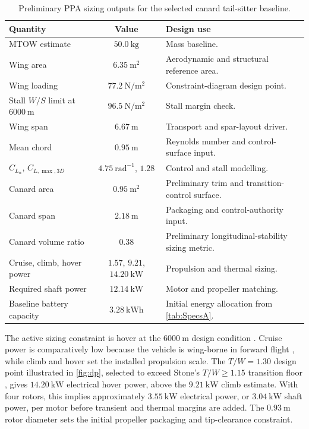 \begin{table}[H]
\centering
\scriptsize
\caption{Preliminary PPA sizing outputs for the selected canard tail-sitter baseline.}
\label{tab:ppa_preliminary_sizing_outputs}
\begin{tabularx}{0.94\textwidth}{l c X}
\toprule
\textbf{Quantity} & \textbf{Value} & \textbf{Design use} \\
\midrule
MTOW estimate          & \(50.0~\mathrm{kg}\)          & Mass baseline. \\
Wing area              & \(6.35~\mathrm{m^2}\)          & Aerodynamic and structural reference area. \\
Wing loading           & \(77.2~\mathrm{N/m^2}\)       & Constraint-diagram design point. \\
Stall \(W/S\) limit at \(6000~\mathrm{m}\) & \(96.5~\mathrm{N/m^2}\) & Stall margin check. \\
Wing span              & \(6.67~\mathrm{m}\)           & Transport and spar-layout driver. \\
Mean chord             & \(0.95~\mathrm{m}\)           & Reynolds number and control-surface input. \\
\(C_{L_\alpha}\), \(C_{L,\max,3D}\) & \(4.75~\mathrm{rad^{-1}}\), \(1.28\)
                                    & Control and stall modelling. \\
Canard area            & \(0.95~\mathrm{m^2}\)          & Preliminary trim and transition-control surface. \\
Canard span            & \(2.18~\mathrm{m}\)            & Packaging and control-authority input. \\
Canard volume ratio    & \(0.38\)                       & Preliminary longitudinal-stability sizing metric. \\
Cruise, climb, hover power & \(1.57\), \(9.21\), \(14.20~\mathrm{kW}\)
                            & Propulsion and thermal sizing. \\
Required shaft power   & \(12.14~\mathrm{kW}\)          & Motor and propeller matching. \\
Baseline battery capacity & \(3.28~\mathrm{kWh}\)      & Initial energy allocation from \autoref{tab:SpecsA}. \\
\bottomrule
\end{tabularx}
\end{table}
 
The active sizing constraint is hover at the \(6000~\mathrm{m}\) design
condition \cite{Leishman2006, Tyan2017}. Cruise power is comparatively low
because the vehicle is wing-borne in forward flight \cite{Ruijgrok2009}, while
climb and hover set the installed propulsion scale. The \(T/W=1.30\) design
point illustrated in \autoref{fig:dp}, selected to exceed Stone's \(T/W \geq 1.15\) transition floor
\cite{StoneClarke2001}, gives \(14.20~\mathrm{kW}\) electrical hover power,
above the \(9.21~\mathrm{kW}\) climb estimate. With four rotors, this
implies approximately \(3.55~\mathrm{kW}\) electrical power, or
\(3.04~\mathrm{kW}\) shaft power, per motor before transient and thermal
margins are added. The \(0.93~\mathrm{m}\) rotor diameter sets the initial
propeller packaging and tip-clearance constraint.

